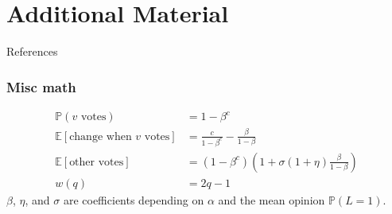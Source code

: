 \documentclass{beamer}
\newcommand\E[0]{\mathbb{E}}
\newcommand\prob[0]{\mathbb{P}}
\begin{document}
\section{Additional Material}
	
		\begin{frame}[standout]
		References
		  
		\end{frame}

		
		\begin{frame}\frametitle{Misc math}
		  \begin{align*}	
		  		\prob(v \text{ votes}) &= 1-\beta^c \\ 
				\E[\text{change when } v \text{ votes}] &= \frac{c}{1-\beta^{c}} - \frac{\beta}{1-\beta} \\ 
				\E[\text{other votes}] &= (1-\beta^c)\left(1 + \sigma (1+\eta) \frac{\beta}{1-\beta}\right) \\ 
				w(q) &= 2q - 1
		  	\end{align*}
		  	$\beta$, $\eta$, and $\sigma$ are coefficients depending on $\alpha$ and the mean opinion $\prob(L = 1)$. 
		\end{frame}
	
\end{document}
